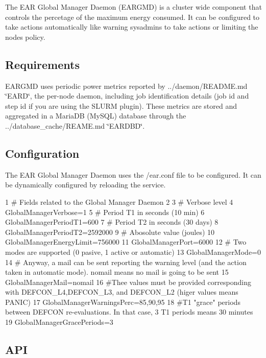The E\+AR Global Manager Daemon (E\+A\+R\+G\+MD) is a cluster wide component that controls the percetage of the maximum energy consumed. It can be configured to take actions automatically like warning sysadmins to take actions or limiting the nodes policy.

\subsection*{Requirements }

E\+A\+R\+G\+MD uses periodic power metrics reported by ../daemon/\+R\+E\+A\+D\+ME.md \char`\"{}\+E\+A\+R\+D\char`\"{}, the per-\/node daemon, including job identification details (job id and step id if you are using the S\+L\+U\+RM plugin). These metrics are stored and aggregated in a Maria\+DB (My\+S\+QL) database through the ../database\+\_\+cache/\+R\+E\+A\+ME.md \char`\"{}\+E\+A\+R\+D\+B\+D\char`\"{}.

\subsection*{Configuration }

The E\+AR Global Manager Daemon uses the {\ttfamily /ear.conf} file to be configured. It can be dynamically configured by reloading the service.


\begin{DoxyCode}
1 # Fields related to the Global Manager Daemon
2 
3 # Verbose level
4 GlobalManagerVerbose=1
5 # Period T1 in seconds (10 min)
6 GlobalManagerPeriodT1=600
7 # Period T2 in seconds (30 days)
8 GlobalManagerPeriodT2=2592000
9 # Abosolute value (joules)
10 GlobalManagerEnergyLimit=756000
11 GlobalManagerPort=6000
12 # Two modes are supported (0 pasive, 1 active or automatic)
13 GlobalManagerMode=0
14 # Anyway, a mail can be sent reporting the warning level (and the action taken in automatic mode). nomail
       means no mail is going to be sent
15 GlobalManagerMail=nomail
16 #Thee values must be provided corresponding with DEFCON\_L4,DEFCON\_L3, and DEFCON\_L2 (higer values means
       PANIC)
17 GlobalManagerWarningsPerc=85,90,95
18 #T1 "grace" periods between DEFCON re-evaluations. In that case, 3 T1 periods means 30 minutes
19 GlobalManagerGracePeriods=3
\end{DoxyCode}


\subsection*{A\+PI }

